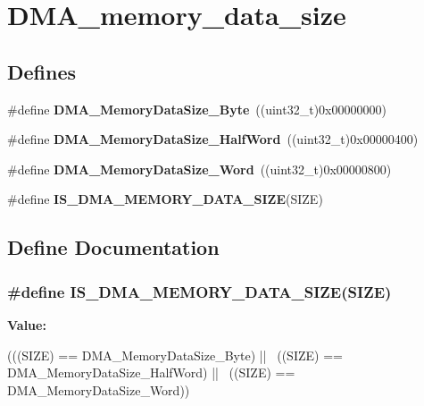 \hypertarget{group__DMA__memory__data__size}{
\section{DMA\_\-memory\_\-data\_\-size}
\label{group__DMA__memory__data__size}
}
\subsection*{Defines}
\begin{DoxyCompactItemize}
\item 
\hypertarget{group__DMA__memory__data__size_gad6093bccb60ff9adf81e21c73c58ba17}{
\#define {\bfseries DMA\_\-MemoryDataSize\_\-Byte}~((uint32\_\-t)0x00000000)}
\label{group__DMA__memory__data__size_gad6093bccb60ff9adf81e21c73c58ba17}

\item 
\hypertarget{group__DMA__memory__data__size_ga74c9b4e547f5eaaf35d4fd3d01ed5741}{
\#define {\bfseries DMA\_\-MemoryDataSize\_\-HalfWord}~((uint32\_\-t)0x00000400)}
\label{group__DMA__memory__data__size_ga74c9b4e547f5eaaf35d4fd3d01ed5741}

\item 
\hypertarget{group__DMA__memory__data__size_gaff403722a6f82d4b34c9ef306507bb98}{
\#define {\bfseries DMA\_\-MemoryDataSize\_\-Word}~((uint32\_\-t)0x00000800)}
\label{group__DMA__memory__data__size_gaff403722a6f82d4b34c9ef306507bb98}

\item 
\#define {\bfseries IS\_\-DMA\_\-MEMORY\_\-DATA\_\-SIZE}(SIZE)
\end{DoxyCompactItemize}


\subsection{Define Documentation}
\hypertarget{group__DMA__memory__data__size_gac9e3748cebcb16d4ae4206d562bc804c}{
\subsubsection[{IS\_\-DMA\_\-MEMORY\_\-DATA\_\-SIZE}]{\setlength{\rightskip}{0pt plus 5cm}\#define IS\_\-DMA\_\-MEMORY\_\-DATA\_\-SIZE(SIZE)}}
\label{group__DMA__memory__data__size_gac9e3748cebcb16d4ae4206d562bc804c}
{\bfseries Value:}
\begin{DoxyCode}
(((SIZE) == DMA_MemoryDataSize_Byte) || \
                                       ((SIZE) == DMA_MemoryDataSize_HalfWord) ||
       \
                                       ((SIZE) == DMA_MemoryDataSize_Word))
\end{DoxyCode}
